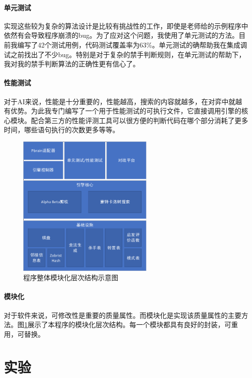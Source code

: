 \documentclass{ctexart}
\begin{document}
\paragraph{单元测试} 实现这些较为复杂的算法设计是比较有挑战性的工作，即使是老师给的示例程序中依然有会导致程序崩溃的bug。为了应对这个问题，我使用了单元测试的方法。目前我编写了42个测试用例，代码测试覆盖率为63\%。单元测试的确帮助我在集成调试之前找出了不少bug。特别是对于复杂的禁手判断规则，在单元测试的帮助下，我对我的禁手判断算法的正确性更有信心了。

\paragraph{性能测试} 对于AI来说，性能是十分重要的，性能越高，搜索的内容就越多，在对弈中就越有优势。为此我专门编写了一个用于性能测试的可执行文件，它直接调用引擎的核心模块。配合第三方的性能评测工具可以很方便的判断代码在哪个部分消耗了更多时间，哪些语句执行的次数更多等等。

\begin{figure}
    \centering
    \includegraphics[width=0.6\textwidth]{assets/modules.pdf}
    \caption{程序整体模块化层次结构示意图}
    \label{fig:modules}
\end{figure}

\paragraph{模块化} 对于软件来说，可修改性是重要的质量属性。而模块化是实现该质量属性的主要方法。图\ref{fig:modules}展示了本程序的模块化层次结构。每一个模块都具有良好的封装，可重用，可替换。

\section{实验}
\end{document}
